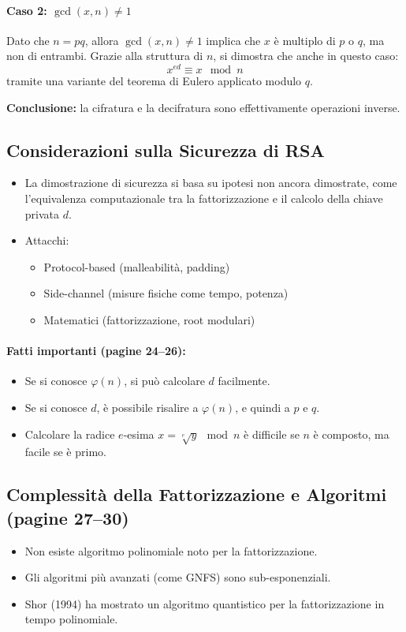 \documentclass{report}
\begin{document}
\paragraph{Caso 2: $\gcd(x, n) \neq 1$}
Dato che $n = pq$, allora $\gcd(x, n) \neq 1$ implica che $x$ \`e multiplo di $p$ o $q$, ma non di entrambi. Grazie alla struttura di $n$, si dimostra che anche in questo caso:
\begin{equation}
x^{ed} \equiv x \mod n
\end{equation}
tramite una variante del teorema di Eulero applicato modulo $q$.

\textbf{Conclusione:} la cifratura e la decifratura sono effettivamente operazioni inverse.

\subsection{Considerazioni sulla Sicurezza di RSA}
\begin{itemize}
  \item La dimostrazione di sicurezza si basa su ipotesi non ancora dimostrate, come l'equivalenza computazionale tra la fattorizzazione e il calcolo della chiave privata $d$.
  \item Attacchi:
  \begin{itemize}
    \item Protocol-based (malleabilit\`a, padding)
    \item Side-channel (misure fisiche come tempo, potenza)
    \item Matematici (fattorizzazione, root modulari)
  \end{itemize}
\end{itemize}

\paragraph{Fatti importanti (pagine 24--26):}
\begin{itemize}
  \item Se si conosce $\varphi(n)$, si pu\`o calcolare $d$ facilmente.
  \item Se si conosce $d$, \`e possibile risalire a $\varphi(n)$, e quindi a $p$ e $q$.
  \item Calcolare la radice $e$-esima $x = \sqrt[e]{y} \mod n$ \`e difficile se $n$ \`e composto, ma facile se \`e primo.
\end{itemize}

\subsection{Complessit\`a della Fattorizzazione e Algoritmi (pagine 27--30)}
\begin{itemize}
  \item Non esiste algoritmo polinomiale noto per la fattorizzazione.
  \item Gli algoritmi pi\`u avanzati (come GNFS) sono sub-esponenziali.
  \item Shor (1994) ha mostrato un algoritmo quantistico per la fattorizzazione in tempo polinomiale.
\end{itemize}
\end{document}
